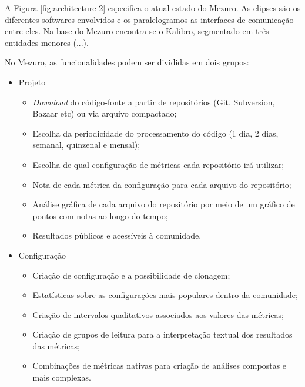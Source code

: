 \documentclass{llncs}
\begin{document}

A Figura \ref{fig:architecture-2} especifica o atual estado do Mezuro. As
elipses são os diferentes softwares envolvidos e os paralelogramos as
interfaces de comunicação entre eles. Na base do Mezuro encontra-se o Kalibro,
segmentado em três entidades menores (...).

No Mezuro, as funcionalidades podem ser divididas em dois grupos:

\begin{itemize}
  \item Projeto
    \begin{itemize}
    \item \textit{Download} do código-fonte a partir de repositórios (Git, Subversion, Bazaar etc) ou via arquivo compactado;
        \item Escolha da periodicidade do processamento do código (1 dia, 2 dias, semanal, quinzenal e mensal);
        \item Escolha de qual configuração de métricas cada repositório irá utilizar;
        \item Nota de cada métrica da configuração para cada arquivo do repositório;
        \item Análise gráfica de cada arquivo do repositório por meio de um gráfico de pontos com notas ao longo do tempo;
        \item Resultados públicos e acessíveis à comunidade.
    \end{itemize}
    \item Configuração
    \begin{itemize}
    \item Criação de configuração e a possibilidade de clonagem;
        \item Estatísticas sobre as configurações mais populares dentro da comunidade;
        \item Criação de intervalos qualitativos associados aos valores das métricas;
        \item Criação de grupos de leitura para a interpretação textual dos resultados das métricas;
        \item Combinações de métricas nativas para criação de análises compostas e mais complexas.
    \end{itemize}
\end{itemize}

\end{document}
